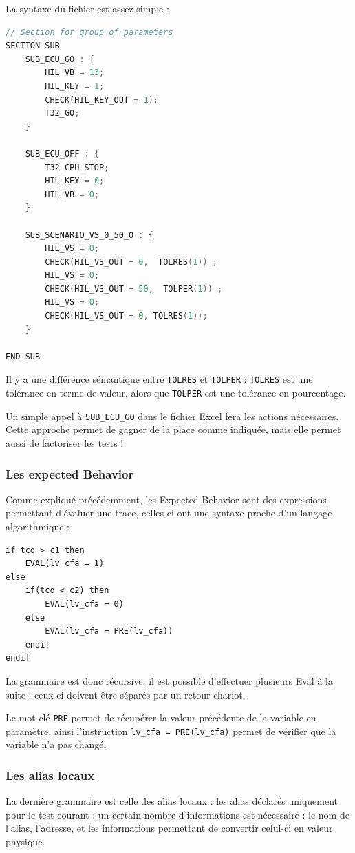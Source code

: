	La syntaxe du fichier est assez simple :
\begin{lstlisting}[caption=Exemple de fichier cnf, language=C]
// Section for group of parameters
SECTION SUB
	SUB_ECU_GO : {
		HIL_VB = 13;
 		HIL_KEY = 1;
		CHECK(HIL_KEY_OUT = 1);
		T32_GO;
	}

	SUB_ECU_OFF : {
		T32_CPU_STOP;
 		HIL_KEY = 0;
		HIL_VB = 0;
	}

	SUB_SCENARIO_VS_0_50_0 : {
		HIL_VS = 0;
		CHECK(HIL_VS_OUT = 0,  TOLRES(1)) ;
		HIL_VS = 0;
		CHECK(HIL_VS_OUT = 50,  TOLPER(1)) ;
		HIL_VS = 0;
		CHECK(HIL_VS_OUT = 0, TOLRES(1));
	}

END SUB
\end{lstlisting}
\begin{remarque}
Il y a une différence sémantique entre \texttt{TOLRES} et \texttt{TOLPER} : \texttt{TOLRES} est une tolérance en terme de valeur, alors que \texttt{TOLPER} est une tolérance en pourcentage.
\end{remarque}
Un simple appel à \texttt{SUB\_ECU\_GO} dans le fichier Excel fera les actions nécessaires. Cette approche permet de gagner de la place comme indiquée, mais elle permet aussi de factoriser les tests !

	\subsubsection{Les expected Behavior}
Comme expliqué précédemment, les Expected Behavior sont des expressions permettant d'évaluer une trace, celles-ci ont une syntaxe proche d'un langage algorithmique : 
\begin{lstlisting}[caption=Exemple d'expected Behavior, language=Algo]
if tco > c1 then 
	EVAL(lv_cfa = 1)
else
	if(tco < c2) then 
		EVAL(lv_cfa = 0)
	else           
		EVAL(lv_cfa = PRE(lv_cfa))
	endif
endif
\end{lstlisting}
La grammaire est donc récursive, il est possible d'effectuer plusieurs Eval à la suite : ceux-ci doivent être séparés par un retour chariot.

Le mot clé \texttt{PRE} permet de récupérer la valeur précédente de la variable en paramètre, ainsi l'instruction \texttt{lv\_cfa = PRE(lv\_cfa)} permet de vérifier que la variable n'a pas changé.
\subsubsection{Les alias locaux}
La dernière grammaire est celle des alias locaux : les alias déclarés uniquement pour le test courant : un certain nombre d'informations est nécessaire : le nom de l'alias, l'adresse, et les informations permettant de convertir celui-ci en valeur physique.

